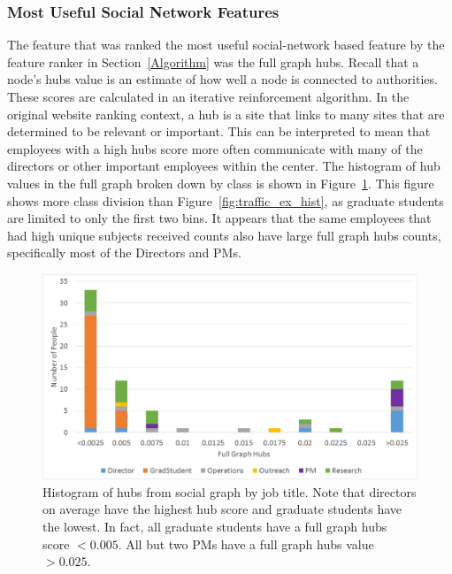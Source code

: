 \documentclass[12pt]{report}
\begin{document}
\subsubsection{Most Useful Social Network Features}
The feature that was ranked the most useful social-network based feature by the feature ranker in Section~\ref{Algorithm} was the full graph hubs.
Recall that a node's hubs value is an estimate of how well a node is connected to authorities.
These scores are calculated in an iterative reinforcement algorithm.
In the original website ranking context, a hub is a site that links to many sites that are determined to be relevant or important.
This can be interpreted to mean that employees with a high hubs score more often communicate with many of the directors or other important employees within the center.
The histogram of hub values in the full graph broken down by class is shown in Figure~\ref{fig:social_ex_hist}.
This figure shows more class division than Figure~\ref{fig:traffic_ex_hist}, as graduate students are limited to only the first two bins.
It appears that the same employees that had high unique subjects received counts also have large full graph hubs counts, specifically most of the Directors and PMs.

\begin{figure}[t]
    \centering
        \includegraphics[width=\columnwidth,trim={.6mm 2mm 0.6mm 3mm},clip]{Hubs_hist}
        \vspace{-17pt}
        \caption[Histogram of the full graph hubs feature]{Histogram of hubs from social graph by job title.  Note that directors on average have the highest hub score and graduate students have the lowest.  In fact, all graduate students have a full graph hubs score $<0.005$.  All but two PMs have a full graph hubs value $>0.025$.}
        \label{fig:social_ex_hist}
\end{figure}
\end{document}
